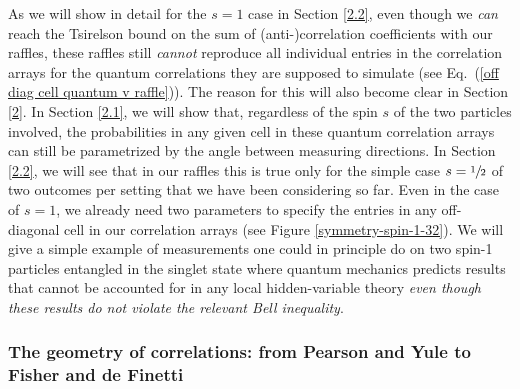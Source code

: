 As we will show in detail for the $s=1$ case in Section \ref{2.2}, even though we \emph{can} reach the Tsirelson bound on the sum of (anti-)correlation coefficients with our raffles, these raffles still \emph{cannot} reproduce all individual entries in the correlation arrays for the quantum correlations they are supposed to simulate (see Eq.\ (\ref{off diag cell quantum v raffle})). The reason for this will also become clear in Section \ref{2}. In Section \ref{2.1}, we will show that, regardless of the spin $s$ of the two particles involved, the probabilities in any given cell in these quantum correlation arrays can still be parametrized by the angle between measuring directions. In Section \ref{2.2}, we will see that in our raffles this is true only for the simple case $s = \sfrac12$ of two outcomes per setting that we have been considering so far. Even in the case of $s=1$, we already need two parameters to specify the entries in any off-diagonal cell in our correlation arrays (see Figure \ref{symmetry-spin-1-32}). We will give a simple example of measurements one could in principle do on two spin-1 particles entangled in the singlet state where quantum mechanics predicts results that cannot be accounted for in any local hidden-variable theory \emph{even though these results do not violate the relevant Bell inequality}.

\subsubsection{The geometry of correlations: from Pearson and Yule to Fisher and de Finetti} \label{1.6.4}


